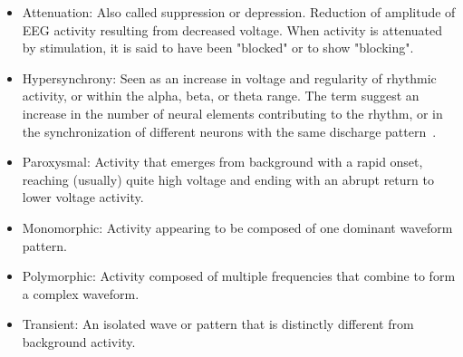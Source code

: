 \documentclass[brainsci,article,submit,moreauthors,pdftex,10pt,a4paper]{mdpi}
\begin{document}
\begin{itemize}
\item Attenuation: Also called suppression or depression. Reduction of amplitude of EEG activity resulting from decreased voltage. When activity is attenuated by stimulation, it is said to have been "blocked" or to show "blocking".
\item Hypersynchrony: Seen as an increase in voltage and regularity of rhythmic activity, or within the alpha, beta, or theta range. The term suggest an increase in the number of neural elements contributing to the rhythm, or in the synchronization of different neurons with the same discharge pattern~\citep{Buzsaki2012}.
\item Paroxysmal: Activity that emerges from background with a rapid onset, reaching (usually) quite high voltage and ending with an abrupt return to lower voltage activity. 
\item Monomorphic: Activity appearing to be composed of one dominant waveform pattern.
\item Polymorphic: Activity composed of multiple frequencies that combine to form a complex waveform.
\item Transient: An isolated wave or pattern that is distinctly different from background activity. 
\end{itemize}

\end{document}
